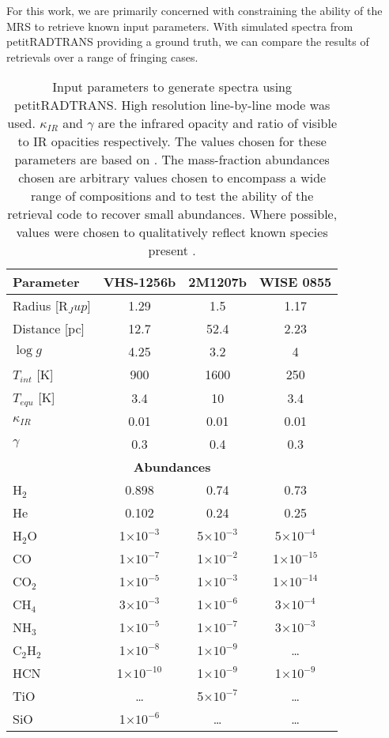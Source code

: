 For this work, we are primarily concerned with constraining the ability of the MRS to retrieve known input parameters. 
With simulated spectra from petitRADTRANS providing a ground truth, we can compare the results of retrievals over a range of fringing cases.
\begin{table}[t]
	\centering
	\begin{tabular}{l|ccc}
		\toprule
		\textbf{Parameter} & \textbf{VHS-1256b} & \textbf{2M1207b} & \textbf{WISE 0855}\\
		\midrule
		Radius [R$_Jup$] & 1.29 & 1.5 & 1.17\\
		Distance [pc] & 12.7 & 52.4 & 2.23\\
		$\log g$ & 4.25 & 3.2 & 4\\
		$T_{int}$ [K]& 900 & 1600 & 250\\
		$T_{equ}$ [K]& 3.4 & 10 & 3.4\\
		$\kappa_{IR}$ & 0.01 & 0.01 & 0.01\\
		$\gamma$ & 0.3 & 0.4 & 0.3\\
		\midrule
		\multicolumn{4}{c}{\textbf{Abundances}}\\
		\midrule
		H$_{2}$ & 0.898 & 0.74 & 0.73\\
		He & 0.102 & 0.24 & 0.25\\
		H$_{2}$O & 1$\times10^{-3}$ & 5$\times10^{-3}$ & 5$\times10^{-4}$\\
		CO & 1$\times10^{-7}$& 1$\times10^{-2}$ & 1$\times10^{-15}$\\
		CO$_{2}$ & 1$\times10^{-5}$& 1$\times10^{-3}$ & 1$\times10^{-14}$\\
		CH$_{4}$ & 3$\times10^{-3}$& 1$\times10^{-6}$ & 3$\times10^{-4}$\\
		NH$_{3}$ & 1$\times10^{-5}$& 1$\times10^{-7}$ & 3$\times10^{-3}$\\
		C$_{2}$H$_{2}$ & 1$\times10^{-8}$& 1$\times10^{-9}$& \ldots \\
		HCN & 1$\times10^{-10}$ & 1$\times10^{-9}$ & 1$\times10^{-9}$ \\
		TiO & \ldots & 5$\times10^{-7}$ & \ldots \\
		SiO & 1$\times10^{-6}$ &  \ldots & \ldots \\
		\bottomrule
	\end{tabular}
	\caption[petitRADTRANS inputs.]{Input parameters to generate spectra using petitRADTRANS. High resolution line-by-line mode was used. $\kappa_{IR}$ and $\gamma$ are the infrared opacity and ratio of visible to IR opacities respectively. The values chosen for these parameters are based on \parencite{Molliere2019}. The mass-fraction abundances chosen are arbitrary values chosen to encompass a wide range of compositions and to test the ability of the retrieval code to recover small abundances. Where possible, values were chosen to qualitatively reflect known species present \parencite{Miles2018}. }
	\label{tab:inputparams}
\end{table}

